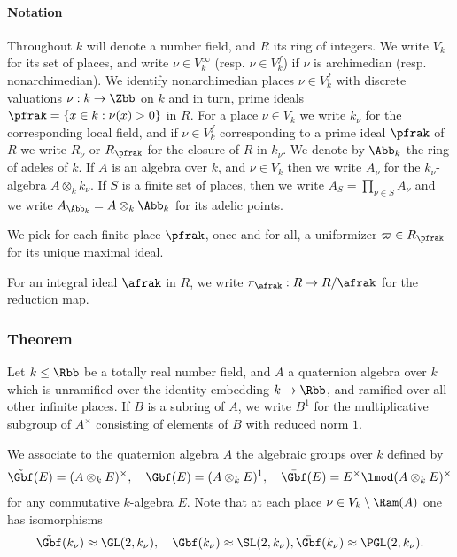 
\paragraph{Notation}
Throughout $k$ will denote a number field, and $R$ its ring of integers. We write $V_k$ for its set of places, and write $\nu \in V_k^\infty$ (resp. $\nu \in V_k^f$) if $\nu$ is archimedian (resp. nonarchimedian).
We identify nonarchimedian places $\nu \in V_k^f$ with discrete valuations $\nu : k \to \Zbb$ on $k$ and in turn, prime ideals $\pfrak = \{ x \in k: \nu(x) > 0\}$ in $R$.
For a place $\nu \in V_k$ we write $k_\nu$ for the corresponding local field, and if $\nu \in V_k^f$ corresponding to a prime ideal $\pfrak$ of $R$ we write $R_\nu$ or $R_\pfrak$ for the closure of $R$ in $k_\nu$. We denote by $\Abb_k$ the ring of adeles of $k$.
If $A$ is an algebra over $k$, and $\nu \in V_k$ then we write $A_\nu$ for the $k_\nu$-algebra $A\otimes_k k_\nu$. If $S$ is a finite set of places, then we write $A_S = \prod_{\nu \in S} A_\nu$ and we write $A_{\Abb_k}= A \otimes_k \Abb_k$ for its adelic points.


We pick for each finite place $\pfrak$, once and for all, a uniformizer $\varpi \in R_\pfrak$ for its unique maximal ideal.

For an integral ideal $\afrak$ in $R$, we write $\pi_\afrak : R \to R/\afrak$ for the reduction map.
\subsubsection{Theorem}
Let $k \leq \Rbb$ be a totally real number field, and $A$ a quaternion algebra over $k$ which is unramified over the identity embedding $k\to \Rbb$, and ramified over all other infinite places.
If $B$ is a subring of $A$, we write $B^1$ for the multiplicative subgroup of $A^\times$ consisting of elements of $B$ with reduced norm $1$.

We associate to the quaternion algebra $A$ the algebraic groups over $k$ defined by
\begin{align*}
  \tilde{\Gbf}(E) = (A\otimes_k E)^\times,\quad \Gbf (E) = (A\otimes_k E)^1,\quad  \bar{\Gbf}(E) = E^\times \lmod (A\otimes_k E)^\times
\end{align*}
for any commutative $k$-algebra $E$. Note that at each place $\nu \in V_k \setminus \Ram(A)$ one has isomorphisms
\begin{align*}
  \tilde{\Gbf}(k_\nu)\approx \GL(2,k_\nu),\quad \Gbf(k_\nu) \approx \SL(2,k_\nu), \bar{\Gbf}(k_\nu) \approx \PGL(2,k_\nu).
\end{align*}


